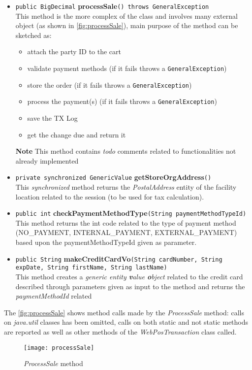 \begin{itemize}
   \item \label{method:processSale} \texttt{public BigDecimal} \textbf{processSale}\texttt{() throws GeneralException}\\
   This method is the more complex of the class and involves many external object (as shown in \autoref{fig:processSale}), main purpose of the method can be sketched as:
   \begin{itemize}
   		\item attach the party ID to the cart
    	\item validate payment methods (if it fails throws a \texttt{GeneralException})
    	\item store the order (if it fails throws a \texttt{GeneralException})
    	\item process the payment(s) (if it fails throws a \texttt{GeneralException})
   		\item save the TX Log
   		\item get the change due and return it
   \end{itemize}
   \textbf{Note} This method contains \emph{todo} comments related to functionalities not already implemented
   \item \texttt{private synchronized GenericValue} \textbf{getStoreOrgAddress}\texttt{()} \\ This \emph{synchronized} method returns the \emph{PostalAddress} entity of the facility location related to the session (to be used for tax calculation).
   \item \texttt{public int} \textbf{checkPaymentMethodType}\texttt{(String paymentMethodTypeId)} \\ This method returns the int code related to the type of payment method (NO\_PAYMENT, INTERNAL\_PAYMENT, EXTERNAL\_PAYMENT) based upon the paymentMethodTypeId given as parameter.
   \item \texttt{public String} \textbf{makeCreditCardVo}\texttt{(String cardNumber, String expDate, String firstName, String lastName)} \\ This method creates a \textit{generic entity \textbf{v}alue \textbf{o}bject} related to the credit card described through parameters given as input to the method and returns the \textit{paymentMethodId} related
\end{itemize}

The \autoref{fig:processSale} shows method calls made by the \emph{ProcessSale} method: calls on \textit{java.util} classes has been omitted, calls on both static and not static methods are reported as well as other methods of the \emph{WebPosTransaction} class called.

\begin{figure}[h]
			\centering
			\texttt{[image: processSale]}
			\caption{
				\label{fig:processSale} 
				\emph{ProcessSale} method
			}
\end{figure}